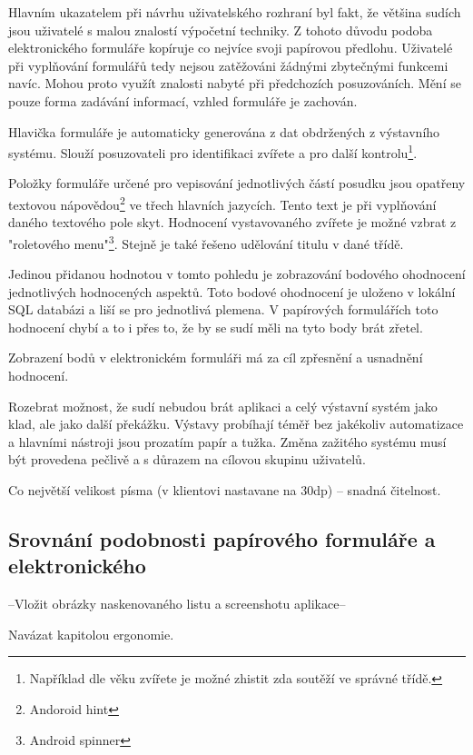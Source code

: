 \documentclass[11pt, oneside]{fithesis2}
\begin{document}
Hlavním ukazatelem při návrhu uživatelského rozhraní byl fakt, že většina sudích jsou uživatelé s malou znalostí výpočetní techniky. Z tohoto důvodu podoba elektronického formuláře kopíruje co nejvíce svoji papírovou předlohu.
Uživatelé při vyplňování formulářů tedy nejsou zatěžováni žádnými zbytečnými funkcemi navíc. Mohou proto využít znalosti nabyté při předchozích posuzováních. Mění se pouze forma zadávání informací, vzhled formuláře je zachován.

Hlavička formuláře je automaticky generována z dat obdržených z výstavního systému.
Slouží posuzovateli pro identifikaci zvířete a pro další kontrolu\footnote{Například dle věku zvířete je možné zhistit zda soutěží ve správné třídě.}.

Položky formuláře určené pro vepisování jednotlivých částí posudku jsou opatřeny textovou nápovědou\footnote{Andoroid hint} ve třech hlavních jazycích. Tento text je při vyplňování daného textového pole skyt.
Hodnocení vystavovaného zvířete je možné vzbrat z "roletového menu"\footnote{Android spinner}. Stejně je také řešeno udělování titulu v dané třídě.
\linebreak

Jedinou přidanou hodnotou v tomto pohledu je zobrazování bodového ohodnocení jednotlivých hodnocených aspektů. Toto bodové ohodnocení je uloženo v lokální SQL databázi a liší se pro jednotlivá plemena.
V papírových formulářích toto hodnocení chybí a to i přes to, že by se sudí měli na tyto body brát zřetel.

Zobrazení bodů v elektronickém formuláři má za cíl zpřesnění a usnadnění hodnocení.
\linebreak

Rozebrat možnost, že sudí nebudou brát aplikaci a celý výstavní systém jako klad, ale jako další překážku.
Výstavy probíhají téměř bez jakékoliv automatizace a hlavními nástroji jsou prozatím papír a tužka. Změna zažitého systému musí být provedena pečlivě a s důrazem na cílovou skupinu uživatelů.

Co největší velikost písma (v klientovi nastavane na 30dp) -- snadná čitelnost.


\subsection{Srovnání podobnosti papírového formuláře a elektronického}
--Vložit obrázky naskenovaného listu a screenshotu aplikace--

Navázat kapitolou ergonomie.
\end{document}
